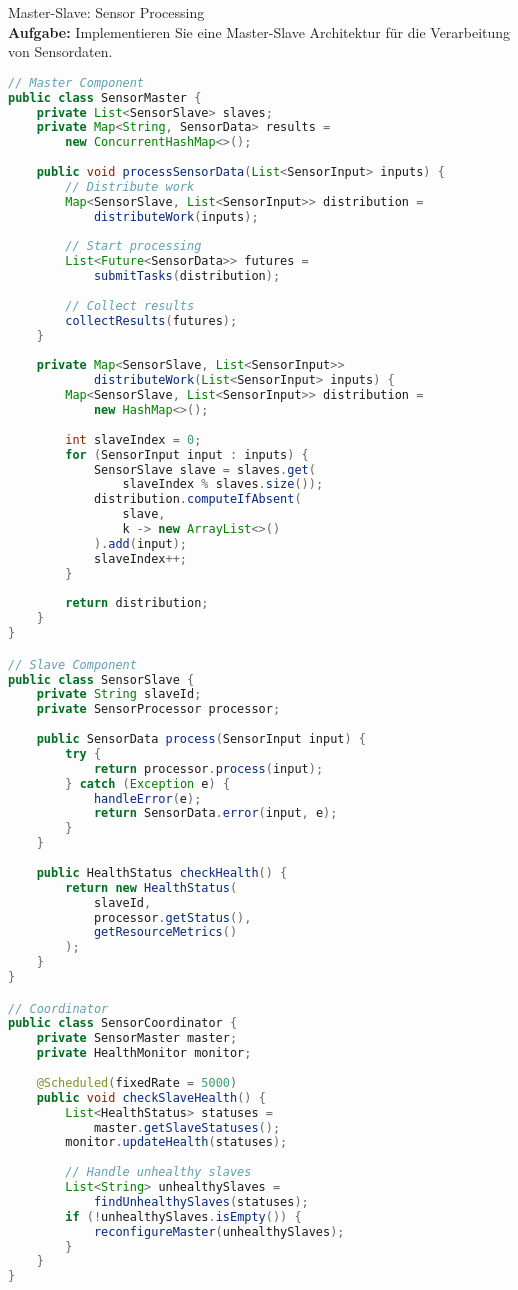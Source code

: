 \begin{example2}[breakable]{Master-Slave: Sensor Processing}\\
\textbf{Aufgabe:} Implementieren Sie eine Master-Slave Architektur für die Verarbeitung von Sensordaten.

\begin{lstlisting}[language=Java, style=basesmol]
// Master Component
public class SensorMaster {
    private List<SensorSlave> slaves;
    private Map<String, SensorData> results = 
        new ConcurrentHashMap<>();
    
    public void processSensorData(List<SensorInput> inputs) {
        // Distribute work
        Map<SensorSlave, List<SensorInput>> distribution = 
            distributeWork(inputs);
            
        // Start processing
        List<Future<SensorData>> futures = 
            submitTasks(distribution);
            
        // Collect results
        collectResults(futures);
    }
    
    private Map<SensorSlave, List<SensorInput>> 
            distributeWork(List<SensorInput> inputs) {
        Map<SensorSlave, List<SensorInput>> distribution = 
            new HashMap<>();
            
        int slaveIndex = 0;
        for (SensorInput input : inputs) {
            SensorSlave slave = slaves.get(
                slaveIndex % slaves.size());
            distribution.computeIfAbsent(
                slave, 
                k -> new ArrayList<>()
            ).add(input);
            slaveIndex++;
        }
        
        return distribution;
    }
}

// Slave Component
public class SensorSlave {
    private String slaveId;
    private SensorProcessor processor;
    
    public SensorData process(SensorInput input) {
        try {
            return processor.process(input);
        } catch (Exception e) {
            handleError(e);
            return SensorData.error(input, e);
        }
    }
    
    public HealthStatus checkHealth() {
        return new HealthStatus(
            slaveId,
            processor.getStatus(),
            getResourceMetrics()
        );
    }
}

// Coordinator
public class SensorCoordinator {
    private SensorMaster master;
    private HealthMonitor monitor;
    
    @Scheduled(fixedRate = 5000)
    public void checkSlaveHealth() {
        List<HealthStatus> statuses = 
            master.getSlaveStatuses();
        monitor.updateHealth(statuses);
        
        // Handle unhealthy slaves
        List<String> unhealthySlaves = 
            findUnhealthySlaves(statuses);
        if (!unhealthySlaves.isEmpty()) {
            reconfigureMaster(unhealthySlaves);
        }
    }
}
\end{lstlisting}
\end{example2}

